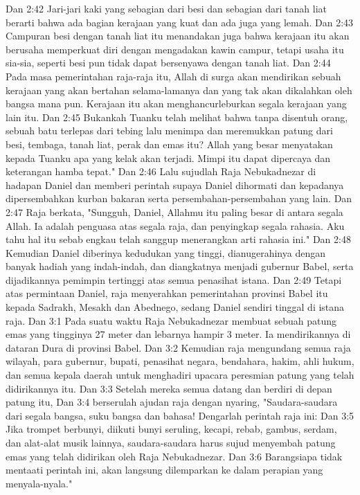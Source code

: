 Dan 2:42  Jari-jari kaki yang sebagian dari besi dan sebagian dari tanah liat berarti bahwa ada bagian kerajaan yang kuat dan ada juga yang lemah.
Dan 2:43  Campuran besi dengan tanah liat itu menandakan juga bahwa kerajaan itu akan berusaha memperkuat diri dengan mengadakan kawin campur, tetapi usaha itu sia-sia, seperti besi pun tidak dapat bersenyawa dengan tanah liat.
Dan 2:44  Pada masa pemerintahan raja-raja itu, Allah di surga akan mendirikan sebuah kerajaan yang akan bertahan selama-lamanya dan yang tak akan dikalahkan oleh bangsa mana pun. Kerajaan itu akan menghancurleburkan segala kerajaan yang lain itu.
Dan 2:45  Bukankah Tuanku telah melihat bahwa tanpa disentuh orang, sebuah batu terlepas dari tebing lalu menimpa dan meremukkan patung dari besi, tembaga, tanah liat, perak dan emas itu? Allah yang besar menyatakan kepada Tuanku apa yang kelak akan terjadi. Mimpi itu dapat dipercaya dan keterangan hamba tepat."
Dan 2:46  Lalu sujudlah Raja Nebukadnezar di hadapan Daniel dan memberi perintah supaya Daniel dihormati dan kepadanya dipersembahkan kurban bakaran serta persembahan-persembahan yang lain.
Dan 2:47  Raja berkata, "Sungguh, Daniel, Allahmu itu paling besar di antara segala Allah. Ia adalah penguasa atas segala raja, dan penyingkap segala rahasia. Aku tahu hal itu sebab engkau telah sanggup menerangkan arti rahasia ini."
Dan 2:48  Kemudian Daniel diberinya kedudukan yang tinggi, dianugerahinya dengan banyak hadiah yang indah-indah, dan diangkatnya menjadi gubernur Babel, serta dijadikannya pemimpin tertinggi atas semua penasihat istana.
Dan 2:49  Tetapi atas permintaan Daniel, raja menyerahkan pemerintahan provinsi Babel itu kepada Sadrakh, Mesakh dan Abednego, sedang Daniel sendiri tinggal di istana raja.
Dan 3:1  Pada suatu waktu Raja Nebukadnezar membuat sebuah patung emas yang tingginya 27 meter dan lebarnya hampir 3 meter. Ia mendirikannya di dataran Dura di provinsi Babel.
Dan 3:2  Kemudian raja mengundang semua raja wilayah, para gubernur, bupati, penasihat negara, bendahara, hakim, ahli hukum, dan semua kepala daerah untuk menghadiri upacara peresmian patung yang telah didirikannya itu.
Dan 3:3  Setelah mereka semua datang dan berdiri di depan patung itu,
Dan 3:4  berserulah ajudan raja dengan nyaring, "Saudara-saudara dari segala bangsa, suku bangsa dan bahasa! Dengarlah perintah raja ini:
Dan 3:5  Jika trompet berbunyi, diikuti bunyi seruling, kecapi, rebab, gambus, serdam, dan alat-alat musik lainnya, saudara-saudara harus sujud menyembah patung emas yang telah didirikan oleh Raja Nebukadnezar.
Dan 3:6  Barangsiapa tidak mentaati perintah ini, akan langsung dilemparkan ke dalam perapian yang menyala-nyala."
